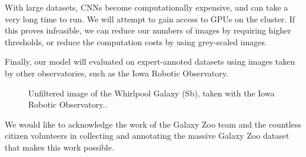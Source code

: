\documentclass[twocolumn]{aastex6}
\begin{document}
With large datasets, CNNs become computationally expensive, and can take a very long time to run. We will attempt to gain access to GPUs on the cluster. If this proves infeasible, we can reduce our numbers of images by requiring higher thresholds, or reduce the computation costs by using grey-scaled images.

Finally, our model will evaluated on expert-annoted datasets using images taken by other observatories, such as the Iowa Robotic Observatory.


\begin{figure}[!t]
\caption{Unfiltered image of the Whirlpool Galaxy (Sb), taken with the Iowa Robotic Observatory..}
\end{figure}

We would like to acknowledge the work of the Galaxy Zoo team and the countless citizen volunteers in collecting and annotating the massive Galaxy Zoo dataset that makes this work possible. 


\end{document}
